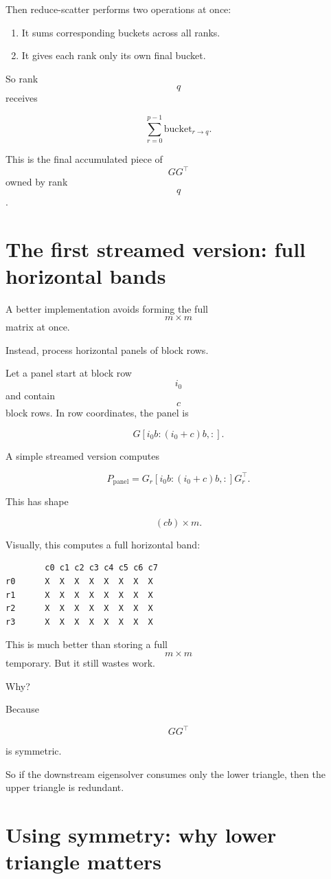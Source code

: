 \documentclass[11pt]{article}
\begin{document}
Then reduce-scatter performs two operations at once:

\begin{enumerate}
    \item It sums corresponding buckets across all ranks.
    \item It gives each rank only its own final bucket.
\end{enumerate}

So rank $$q$$ receives

$$
\sum_{r=0}^{p-1} \text{bucket}_{r \rightarrow q}.
$$

This is the final accumulated piece of $$GG^\top$$ owned by rank $$q$$.

\section{The first streamed version: full horizontal bands}

A better implementation avoids forming the full $$m \times m$$ matrix at once.

Instead, process horizontal panels of block rows.

Let a panel start at block row $$i_0$$ and contain $$c$$ block rows. In row coordinates, the panel is

$$
G[i_0b : (i_0+c)b, :].
$$

A simple streamed version computes

$$
P_{\text{panel}}
=
G_r[i_0b : (i_0+c)b, :]
G_r^\top.
$$

This has shape

$$
(cb) \times m.
$$

Visually, this computes a full horizontal band:

\begin{lstlisting}
        c0 c1 c2 c3 c4 c5 c6 c7
r0      X  X  X  X  X  X  X  X
r1      X  X  X  X  X  X  X  X
r2      X  X  X  X  X  X  X  X
r3      X  X  X  X  X  X  X  X
\end{lstlisting}

This is much better than storing a full $$m \times m$$ temporary. But it still wastes work.

Why?

Because

$$
GG^\top
$$

is symmetric.

So if the downstream eigensolver consumes only the lower triangle, then the upper triangle is redundant.

\section{Using symmetry: why lower triangle matters}
\end{document}
